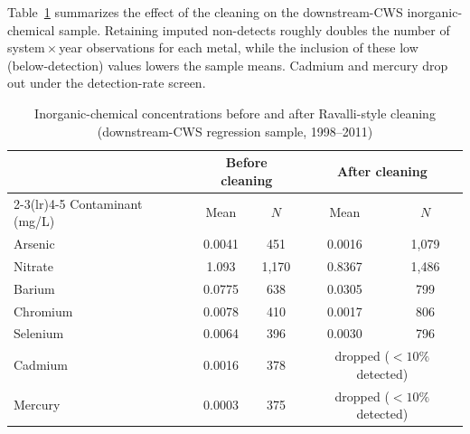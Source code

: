 Table~\ref{tab:6yr_cleaning_compare} summarizes the effect of the cleaning on the
downstream-CWS inorganic-chemical sample. Retaining imputed non-detects roughly
doubles the number of system\,$\times$\,year observations for each metal, while
the inclusion of these low (below-detection) values lowers the sample means.
Cadmium and mercury drop out under the detection-rate screen.

\begin{table}[htbp]
  \centering
  \caption{Inorganic-chemical concentrations before and after Ravalli-style
    cleaning (downstream-CWS regression sample, 1998--2011)}
  \label{tab:6yr_cleaning_compare}
  \begin{tabular}{lcccc}
    \toprule
    & \multicolumn{2}{c}{Before cleaning} & \multicolumn{2}{c}{After cleaning} \\
    \cmidrule(lr){2-3}\cmidrule(lr){4-5}
    Contaminant (mg/L) & Mean & $N$ & Mean & $N$ \\
    \midrule
    Arsenic   & 0.0041 & 451   & 0.0016 & 1{,}079 \\
    Nitrate   & 1.093  & 1{,}170 & 0.8367 & 1{,}486 \\
    Barium    & 0.0775 & 638   & 0.0305 & 799   \\
    Chromium  & 0.0078 & 410   & 0.0017 & 806   \\
    Selenium  & 0.0064 & 396   & 0.0030 & 796   \\
    Cadmium   & 0.0016 & 378   & \multicolumn{2}{c}{dropped ($<10\%$ detected)} \\
    Mercury   & 0.0003 & 375   & \multicolumn{2}{c}{dropped ($<10\%$ detected)} \\
    \bottomrule
  \end{tabular}
\end{table}
